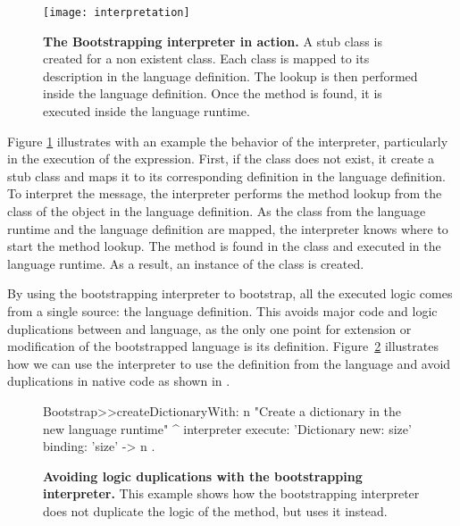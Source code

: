 \begin{figure}[!ht]
\center
\texttt{[image: interpretation]}
\caption{\textbf{The Bootstrapping interpreter in action.} A stub class is created for a non existent class. Each class is mapped to its description in the language definition. The lookup is then performed inside the language definition. Once the method is found, it is executed inside the language runtime.\label{fig:interpretation}}
\end{figure}

Figure \ref{fig:interpretation} illustrates with an example the behavior of the interpreter, particularly in the execution of the  expression. First, if the class  does not exist, it create a stub  class and maps it to its corresponding definition in the language definition. To interpret the  message, the interpreter performs the method lookup from the class of the object in the language definition. As the class from the language runtime and the language definition are mapped, the interpreter knows where to start the method lookup. The method is found in the  class and executed in the language runtime. As a result, an instance of the  class is created.



By using the bootstrapping interpreter to bootstrap, all the executed logic comes from a single source: the language definition. This avoids  major code and logic duplications between \VM and language, as the only one point for extension or modification of the bootstrapped language is its definition. Figure~\ref{code:logic_dup3} illustrates how we can use the interpreter to use the  definition from the language and avoid duplications in native code as shown in .


\begin{figure}[ht]
\begin{code}
Bootstrap>>createDictionaryWith: n
    "Create a dictionary in the new language runtime"
    ^ interpreter
            execute: 'Dictionary new: size'
            binding: { 'size' -> n }.
\end{code}
\caption{\textbf{Avoiding logic duplications with the bootstrapping interpreter.} This example shows how the bootstrapping interpreter does not duplicate the logic of the  method, but uses it instead.\label{code:logic_dup3}}
\end{figure}


